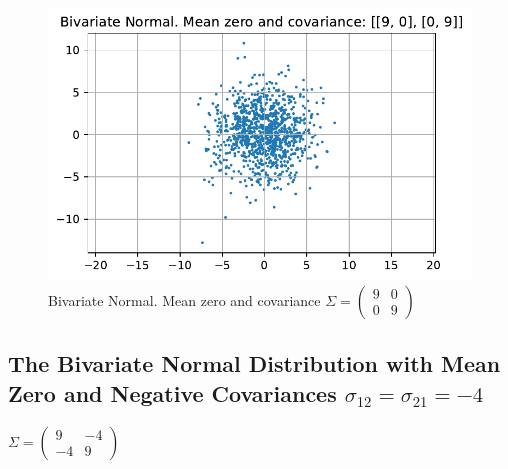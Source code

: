 \documentclass[
  letterpaper,
  DIV=11,
  numbers=noendperiod]{scrreprt}
\begin{document}
\begin{figure}

{\centering \includegraphics{006_num_gp_files/figure-pdf/fig-bi9000-output-1.pdf}

}

\caption{\label{fig-bi9000}Bivariate Normal. Mean zero and covariance
\(\Sigma=\begin{pmatrix} 9 & 0 \\ 0 & 9\end{pmatrix}\)}

\end{figure}

\hypertarget{the-bivariate-normal-distribution-with-mean-zero-and-negative-covariances-sigma_12-sigma_21--4}{%
\subsection{\texorpdfstring{The Bivariate Normal Distribution with Mean
Zero and Negative Covariances
\(\sigma_{12} = \sigma_{21} = -4\)}{The Bivariate Normal Distribution with Mean Zero and Negative Covariances \textbackslash sigma\_\{12\} = \textbackslash sigma\_\{21\} = -4}}\label{the-bivariate-normal-distribution-with-mean-zero-and-negative-covariances-sigma_12-sigma_21--4}}

\(\Sigma=\begin{pmatrix} 9 & -4 \\ -4 & 9\end{pmatrix}\)
\end{document}
